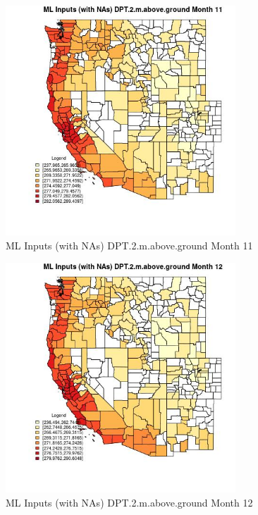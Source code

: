 \begin{figure} 
\centering  
\includegraphics[width=0.77\textwidth]{Code_Outputs/Report_ML_input_PM25_Step4_part_e_de_duplicated_aves_compiled_2019-05-21wNAs_CountyDPT2mabovegroundmedianMonth11.jpg} 
\caption{\label{fig:Report_ML_input_PM25_Step4_part_e_de_duplicated_aves_compiled_2019-05-21wNAsCountyDPT2mabovegroundmedianMonth11}ML Inputs (with NAs) DPT.2.m.above.ground Month 11} 
\end{figure} 
 

\begin{figure} 
\centering  
\includegraphics[width=0.77\textwidth]{Code_Outputs/Report_ML_input_PM25_Step4_part_e_de_duplicated_aves_compiled_2019-05-21wNAs_CountyDPT2mabovegroundmedianMonth12.jpg} 
\caption{\label{fig:Report_ML_input_PM25_Step4_part_e_de_duplicated_aves_compiled_2019-05-21wNAsCountyDPT2mabovegroundmedianMonth12}ML Inputs (with NAs) DPT.2.m.above.ground Month 12} 
\end{figure} 
 

